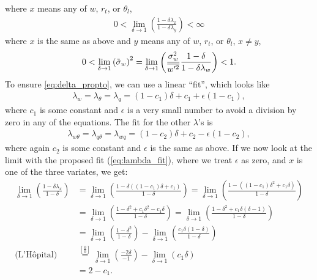 where $x$ means any of $w$, $r_t$, or $\theta_l$,
\begin{align}
    0 < \lim_{\delta\to 1} \left(\frac{1-\delta\lambda_x}{1-\delta\lambda_y}\right) < \infty
\end{align}
where $x$ is the same as above and $y$ means any of $w$, $r_t$, or $\theta_l$, $x \neq y$,
\begin{align}
    0 < \lim_{\delta \to 1} \left({\tilde{\sigma}_w}\right)^2
    = \lim_{\delta \to 1} \left(\frac{\sigma_w^2}{\overline{w'^2}} \frac{1-\delta}{1-\delta \lambda_w}\right) < 1.
\end{align}
To ensure \cref{eq:delta_propto}, we can use a linear \enquote{fit}, which looks like
\begin{align}
    \label{eq:lambda_fit}
    \lambda_w = \lambda_\theta = \lambda_q
    = (1 - c_1) \delta + c_1 + \epsilon (1 - c_1),
\end{align}
where $c_1$ is some constant and $\epsilon$ is a very small number to avoid a division by zero in any of the equations.
The fit for the other $\lambda$'s is
\begin{align}
    \label{eq:lambda_xy_fit}
    \lambda_{w\theta} = \lambda_{q\theta} = \lambda_{wq}
    = (1 - c_2) \delta + c_2 - \epsilon (1 - c_2),
\end{align}
where again $c_2$ is some constant and $\epsilon$ is the same as above.
If we now look at the limit with the proposed fit (\cref{eq:lambda_fit}), where we treat $\epsilon$ as zero,
and $x$ is one of the three variates, we get:
\begin{align}
    \lim_{\delta \to 1} \left(\frac{1 - \delta\lambda_x}{1 - \delta}\right)
    &= \lim_{\delta \to 1} \left(\frac{1 - \delta((1 - c_1) \delta + c_1)}{1 - \delta}\right)
    = \lim_{\delta \to 1} \left(\frac{1 - ((1 - c_1) \delta^2 + c_1\delta)}{1 - \delta}\right) \\
    &= \lim_{\delta \to 1} \left(\frac{1 - \delta^2 + c_1\delta^2 - c_1\delta}{1 - \delta}\right)
    = \lim_{\delta \to 1} \left(\frac{1 - \delta^2 + c_1\delta(\delta - 1)}{1 - \delta}\right) \\
    &= \lim_{\delta \to 1} \left(\frac{1 - \delta^2}{1 - \delta}\right)
    - \lim_{\delta \to 1} \left(\frac{c_1\delta(1 - \delta)}{1 - \delta}\right) \\
    \text{(L'Hôpital)}
    &\overset{\left[\frac{0}{0}\right]}{=} \lim_{\delta \to 1} \left(\frac{-2\delta}{-1}\right)
    - \lim_{\delta \to 1} \left(c_1\delta\right) \\
    &= 2 - c_1.
\end{align}

